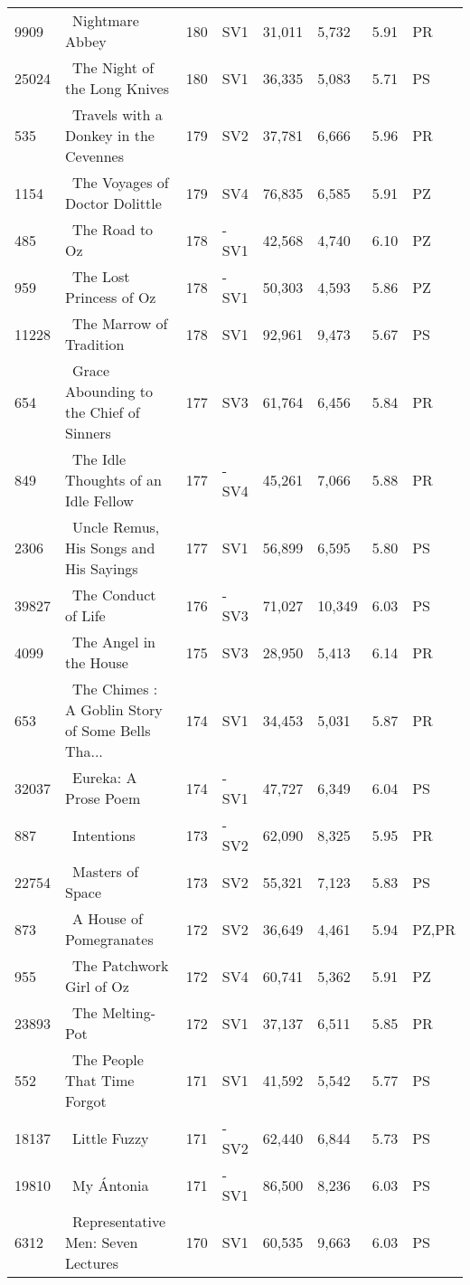 \begin{longtable}{l | l | l | l | l | l | l | l}
9909 & ~Nightmare Abbey & 180 & SV1 & 31,011 & 5,732 & 5.91 & PR\\
25024 & ~The Night of the Long Knives & 180 & SV1 & 36,335 & 5,083 & 5.71 & PS\\
535 & ~Travels with a Donkey in the Cevennes & 179 & SV2 & 37,781 & 6,666 & 5.96 & PR\\
1154 & ~The Voyages of Doctor Dolittle & 179 & SV4 & 76,835 & 6,585 & 5.91 & PZ\\
485 & ~The Road to Oz & 178 & -SV1 & 42,568 & 4,740 & 6.10 & PZ\\
959 & ~The Lost Princess of Oz & 178 & -SV1 & 50,303 & 4,593 & 5.86 & PZ\\
11228 & ~The Marrow of Tradition & 178 & SV1 & 92,961 & 9,473 & 5.67 & PS\\
654 & ~Grace Abounding to the Chief of Sinners & 177 & SV3 & 61,764 & 6,456 & 5.84 & PR\\
849 & ~The Idle Thoughts of an Idle Fellow & 177 & -SV4 & 45,261 & 7,066 & 5.88 & PR\\
2306 & ~Uncle Remus, His Songs and His Sayings & 177 & SV1 & 56,899 & 6,595 & 5.80 & PS\\
39827 & ~The Conduct of Life & 176 & -SV3 & 71,027 & 10,349 & 6.03 & PS\\
4099 & ~The Angel in the House & 175 & SV3 & 28,950 & 5,413 & 6.14 & PR\\
653 & ~The Chimes
: A Goblin Story of Some Bells Tha... & 174 & SV1 & 34,453 & 5,031 & 5.87 & PR\\
32037 & ~Eureka: A Prose Poem & 174 & -SV1 & 47,727 & 6,349 & 6.04 & PS\\
887 & ~Intentions & 173 & -SV2 & 62,090 & 8,325 & 5.95 & PR\\
22754 & ~Masters of Space & 173 & SV2 & 55,321 & 7,123 & 5.83 & PS\\
873 & ~A House of Pomegranates & 172 & SV2 & 36,649 & 4,461 & 5.94 & PZ,PR\\
955 & ~The Patchwork Girl of Oz & 172 & SV4 & 60,741 & 5,362 & 5.91 & PZ\\
23893 & ~The Melting-Pot & 172 & SV1 & 37,137 & 6,511 & 5.85 & PR\\
552 & ~The People That Time Forgot & 171 & SV1 & 41,592 & 5,542 & 5.77 & PS\\
18137 & ~Little Fuzzy & 171 & -SV2 & 62,440 & 6,844 & 5.73 & PS\\
19810 & ~My Ántonia & 171 & -SV1 & 86,500 & 8,236 & 6.03 & PS\\
6312 & ~Representative Men: Seven Lectures & 170 & SV1 & 60,535 & 9,663 & 6.03 & PS\\

\end{longtable}
